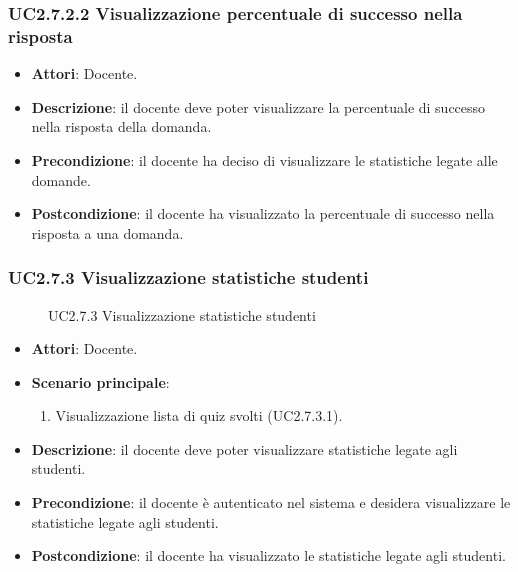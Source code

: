 \subsubsection{UC2.7.2.2 Visualizzazione percentuale di successo nella risposta}
\begin{itemize}
\item \textbf{Attori}: Docente.
\item \textbf{Descrizione}: il docente deve poter visualizzare la percentuale di successo nella risposta della domanda.
\item \textbf{Precondizione}: il docente ha deciso di visualizzare le statistiche legate alle domande.
\item \textbf{Postcondizione}: il docente ha visualizzato la percentuale di successo nella risposta a una domanda.
\end{itemize}
\subsubsection{UC2.7.3 Visualizzazione statistiche studenti}
\begin{figure}[H]
\centering
\noindent{}
\caption{UC2.7.3 Visualizzazione statistiche studenti}
\end{figure}
\begin{itemize}
\item \textbf{Attori}: Docente.
\item \textbf{Scenario principale}:
\begin{enumerate}
\item Visualizzazione lista di quiz svolti (UC2.7.3.1).
\end{enumerate}
\item \textbf{Descrizione}:  il docente deve poter visualizzare statistiche legate agli studenti.
\item \textbf{Precondizione}: il docente è autenticato nel sistema e desidera visualizzare le statistiche legate agli studenti.
\item \textbf{Postcondizione}: il docente ha visualizzato le statistiche legate agli studenti.
\end{itemize}
